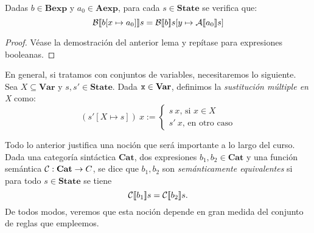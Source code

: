\begin{lema}
Dadas $b \in \mathbf{Bexp}$ y $a_0 \in \mathbf{Aexp}$, para cada $s \in \mathbf{State}$ se verifica que:
$$\mathcal{B}[\![b[x \mapsto a_0]]\!]s = \mathcal{B}[\![b]\!]s[y\mapsto \mathcal{A}[\![a_0]\!]s]$$
\end{lema}
\begin{proof}
Véase la demostración del anterior lema y repítase para expresiones booleanas.
\end{proof}

En general, si tratamos con conjuntos de variables, necesitaremos lo siguiente. Sea $X\subseteq \mathbf{Var}$ y $s, s' \in \mathbf{State}$. Dada $\texttt{x}\in \mathbf{Var}$, definimos la \textit{sustitución múltiple en X} como:
$$(s'[X\mapsto s])\ x := \begin{cases} s\ x\text{, si } x\in X \\ s'\ x \text{, en otro caso}\end{cases}$$






Todo lo anterior justifica una noción que será importante a lo largo del curso. Dada una categoría sintáctica $\textbf{Cat}$, dos expresiones $b_1, b_2 \in \textbf{Cat}$ y una función semántica $\mathcal{C}: \textbf{Cat}\rightarrow C$, se dice que $b_1, b_2$ son \textit{semánticamente equivalentes} si para todo $s\in \textbf{State}$ se tiene
\[
    \mathcal{C}[\![b_1]\!]s = \mathcal{C}[\![b_2]\!]s.
\]
De todos modos, veremos que esta noción depende en gran medida del conjunto de reglas que empleemos.